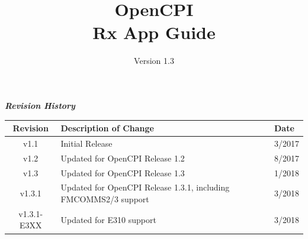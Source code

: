 \def\docTitle{OpenCPI\\ Rx App Guide}
\def\docVersion{1.3}

\date{Version \docVersion} %
\title{\docTitle}
\usepackage{graphicx}
\graphicspath{ {figures/} }
\usepackage{textcomp}


\maketitle
\newpage
	\begin{center}
	\textit{\textbf{Revision History}}
		\begin{table}[H]
		\label{table:revisions} %
			\begin{tabularx}{\textwidth}{|c|X|l|}
			\hline
			\rowcolor{blue}
			\textbf{Revision} & \textbf{Description of Change} & \textbf{Date} \\
		    \hline
		    v1.1 & Initial Release & 3/2017 \\
		    \hline
		    v1.2 & Updated for OpenCPI Release 1.2 & 8/2017 \\
			\hline
			v1.3 & Updated for OpenCPI Release 1.3 & 1/2018 \\
			\hline
			v1.3.1 & Updated for OpenCPI Release 1.3.1, including FMCOMMS2/3 support & 3/2018 \\
			\hline
			v1.3.1-E3XX & Updated for E310 support & 3/2018 \\
			\hline
			\end{tabularx}
		\end{table}
	\end{center}

